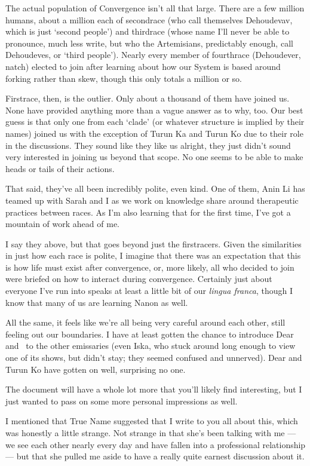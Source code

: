 The actual population of Convergence isn't all that large. There are a few million humans, about a million each of secondrace (who call themselves Dehoudevav, which is just `second people') and thirdrace (whose name I'll never be able to pronounce, much less write, but who the Artemisians, predictably enough, call Dehoudeves, or `third people'). Nearly every member of fourthrace (Dehoudever, natch) elected to join after learning about how our System is based around forking rather than skew, though this only totals a million or so.

Firstrace, then, is the outlier. Only about a thousand of them have joined us. None have provided anything more than a vague answer as to why, too. Our best guess is that only one from each `clade' (or whatever structure is implied by their names) joined us with the exception of Turun Ka and Turun Ko due to their role in the discussions. They sound like they like us alright, they just didn't sound very interested in joining us beyond that scope. No one seems to be able to make heads or tails of their actions.

That said, they've all been incredibly polite, even kind. One of them, Anin Li has teamed up with Sarah and I as we work on knowledge share around therapeutic practices between races. As I'm also learning that for the first time, I've got a mountain of work ahead of me.

I say they above, but that goes beyond just the firstracers. Given the similarities in just how each race is polite, I imagine that there was an expectation that this is how life must exist after convergence, or, more likely, all who decided to join were briefed on how to interact during convergence. Certainly just about everyone I've run into speaks at least a little bit of our \emph{lingua franca}, though I know that many of us are learning Nanon as well.

All the same, it feels like we're all being very careful around each other, still feeling out our boundaries. I have at least gotten the chance to introduce Dear and \Partner\ to the other emissaries (even Iska, who stuck around long enough to view one of its shows, but didn't stay; they seemed confused and unnerved). Dear and Turun Ko have gotten on well, surprising no one.

The document will have a whole lot more that you'll likely find interesting, but I just wanted to pass on some more personal impressions as well.

I mentioned that True Name suggested that I write to you all about this, which was honestly a little strange. Not strange in that she's been talking with me — we see each other nearly every day and have fallen into a professional relationship — but that she pulled me aside to have a really quite earnest discussion about it.

